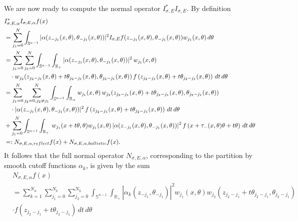 \documentclass[10pt]{amsart}
\theoremstyle{definition}
\theoremstyle{definition}
\theoremstyle{definition}
\begin{document}
We are now ready to compute the normal operator $I_{\sigma,E}^{*}I_{\sigma,E}$. By definition
\begin{align}
& I_{\sigma,E,\alpha}^{*}I_{\sigma,E,\alpha}f(x) \notag\\
& = \sum_{j_{1}=0}^{N}\int_{\mathbb{S}^{n-1}}|\alpha(z_{-j_{1}}(x,\theta), \theta_{-j_{1}}(x,\theta))|^{2}I_{\sigma,E}f(z_{-j_{1}}(x,\theta), \theta_{-j_{1}}(x,\theta))w_{j_{1}}(x,\theta)\, d\theta\notag\\
& = \sum_{j_{1}=0}^{N}\sum_{j_{2}=0}^{N} \int_{\mathbb{S}^{n-1}}\int_{\mathbb{R}_{+}}|\alpha(z_{-j_{1}}(x,\theta), \theta_{-j_{1}}(x,\theta))|^{2} \, w_{j_{1}}(x,\theta)\notag\\
& \quad \cdot w_{j_{2}}(z_{j_{2}-j_{1}}(x,\theta)+t\theta_{j_{2}-j_{1}}(x,\theta), \theta_{j_{2}-j_{1}}(x,\theta)) \, f\left(z_{j_{2}-j_{1}}(x,\theta) + t\theta_{j_{2}-j_{1}}(x,\theta)\right)\,dt\,d\theta \notag\\
& =\sum_{j_{1}=0}^{N}\sum_{j_{2}=0, j_{2} \neq j_{1}}^{N}\int_{\mathbb{S}^{n-1}}\int_{\mathbb{R}_{+}}w_{j_{1}}(x,\theta)\,w_{j_{2}}(z_{j_{2}-j_{1}}(x,\theta) + t\theta_{j_{2}-j_{1}}(x,\theta), \theta_{j_{2}-j_{1}}(x,\theta)) \notag\\
& \quad \cdot |\alpha(z_{-j_{1}}(x,\theta), \theta_{-j_{1}}(x,\theta))|^{2}\, f\left(z_{j_{2}-j_{1}}(x,\theta) + t\theta_{j_{2}-j_{1}}(x,\theta) \right)\,dt\,d\theta\notag\\
& + \sum_{j_{1}=0}^{N}\int_{\mathbb{S}^{n-1}}\int_{\mathbb{R}_{+}}\, w_{j_{1}}(x+t\theta,\theta)w_{j_{1}}(x,\theta) \, |\alpha(z_{-j_{1}}(x,\theta), \theta_{-j_{1}}(x,\theta))|^{2} \, f\left(x +\tau_{-}(x,\theta)\theta + t\theta \right)\,dt\,d\theta \notag\\
& =: N_{\sigma, E, \alpha, reflect}f(x) + N_{\sigma, E, \alpha, ballistic}f(x). \label{eq:normalop}
\end{align}
It follows that the full normal operator $N_{\sigma,E,\alpha}$, corresponding to the partition by smooth cutoff functions $\alpha_{k}$, is given by the sum
\begin{align*}
& N_{\sigma,E,\alpha}f(x) \\
& = \sum_{k=1}^{N_{\alpha}}\sum_{j_{1}=0}^{N_k}\sum_{j_{2}=0}^{N_k}\int_{\mathbb{S}^{n-1}}\int_{\mathbb{R}_{+}} |\alpha_{k}(z_{-j_{1}}, \theta_{-j_{1}})|^{2} w_{j_{1}}\left( x,\theta \right) w_{j_{2}}\left(z_{j_{2}-j_{1}}+ t\theta_{j_{2}-j_{1}}, \theta_{j_{2}-j_{1}}\right)\\
& \cdot f\left(z_{j_{2}-j_{1}}+ t\theta_{j_{2}-j_{1}}\right)\, dt\,d\theta
\end{align*}
\end{document}
